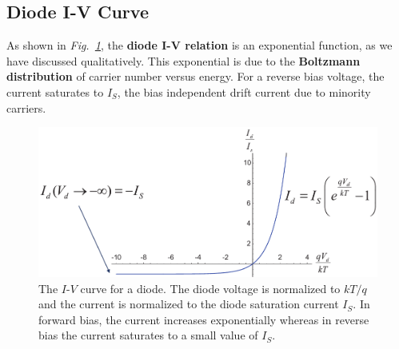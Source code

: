 \subsection{Diode I-V Curve}
As shown in \emph{Fig.~\ref{fig:slide38}}, the \textbf{diode I-V relation} is an exponential function, as we have discussed qualitatively.    This exponential is due to the \textbf{Boltzmann distribution} of carrier number versus energy.  For a reverse bias voltage, the current saturates to $I_S$, the bias independent drift current due to minority carriers.
\begin{figure}[H]
\centering
\includegraphics[width=\columnwidth]{slide38}
\caption{The $I$-$V$ curve for a diode.  The diode voltage is normalized to $kT/q$ and the current is normalized to the diode saturation current $I_S$.   In forward bias, the current increases exponentially whereas in reverse bias the current saturates to a small value of $I_S$.}
\label{fig:slide38}
\end{figure}
\newpage

